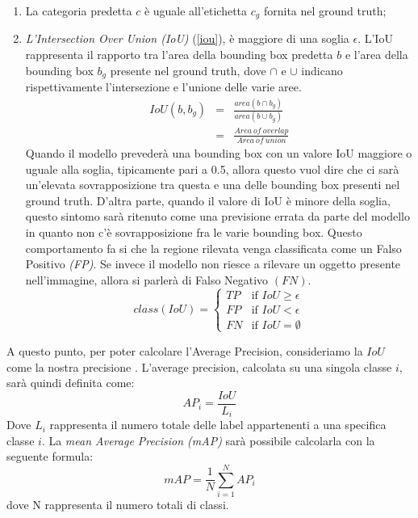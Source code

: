 \begin{enumerate}
    \item La categoria predetta $c$ è uguale all’etichetta $c_g$ fornita nel ground truth;
    \item \emph{L'Intersection Over Union (IoU)} (\ref{iou}), è maggiore di una soglia $\epsilon$. L'IoU 
    rappresenta il rapporto tra l'area della bounding box predetta $b$ e l'area 
    della bounding box $b_g$ presente nel ground truth, dove $\cap$ e $\cup$ indicano 
    rispettivamente l’intersezione e l’unione delle varie aree.
    \begin{eqnarray}\label{iou}
        IoU(b,b_g) & = & \frac{area(b \cap b_g)}{area(b \cup b_g)} \nonumber \\
                 & = & \frac{Area \ of \ overlap}{Area \ of \ union}
    \end{eqnarray}
    Quando il modello prevederà una bounding box con un valore IoU maggiore 
    o uguale alla soglia,  tipicamente pari a 0.5, allora questo vuol dire che ci 
    sarà un’elevata sovrapposizione tra questa e una delle bounding box presenti 
    nel ground truth. D’altra parte, quando il valore di IoU è minore della 
    soglia, questo sintomo sarà ritenuto come una previsione errata da parte 
    del modello in quanto non c’è sovrapposizione fra le varie bounding box. 
    Questo comportamento fa si che la regione rilevata venga classificata come 
    un Falso Positivo \emph{(FP)}. Se invece il modello non riesce a rilevare un oggetto 
    presente nell’immagine, allora si parlerà di Falso Negativo $(FN)$.
    \begin{equation}\label{iou values}
        class(IoU) = \left\{
            \begin{array}{rl}
            TP & \mbox{if } IoU \geq \epsilon \\
            FP & \mbox{if } IoU < \epsilon \\
            FN & \mbox{if } IoU = \emptyset
            \end{array}
            \right.
    \end{equation}
\end{enumerate}
A questo punto, per poter calcolare l’Average Precision, consideriamo la $IoU$ come 
la nostra precisione \cite{rosebrock2017deep}. L’average precision, calcolata su una singola classe $i$, sarà 
quindi definita come:
\begin{equation}\label{average precision}
    AP_i = \frac{IoU}{L_i}
\end{equation}
Dove $L_i$ rappresenta il numero totale delle label appartenenti a una specifica classe 
$i$. La \emph{mean Average Precision (mAP)} sarà possibile calcolarla con la seguente formula:
\begin{equation}\label{mean average precision}
    mAP = \frac{1}{N}\sum_{i=1}^NAP_i
\end{equation}
dove N rappresenta il numero totali di classi.

